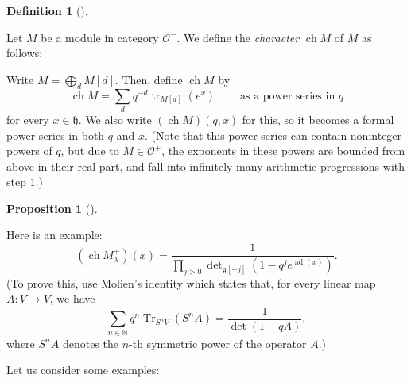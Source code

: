\documentclass
[numbers=enddot,12pt,final,onecolumn,german,notitlepage]{scrartcl}%
\theoremstyle{definition}
\newtheorem{prop}[theo]{Proposition}
\newenvironment{proposition}[1][]
{\begin{prop}[#1]\begin{leftbar}}
{\end{leftbar}\end{prop}}
\newtheorem{defi}[theo]{Definition}
\newenvironment{definition}[1][]
{\begin{defi}[#1]\begin{leftbar}}
{\end{leftbar}\end{defi}}
\begin{document}
\begin{definition}
Let $M$ be a module in category $\mathcal{O}^{+}$. We define the
\textit{character} $\operatorname*{ch}M$ of $M$ as follows:

Write $M=\bigoplus\limits_{d}M\left[  d\right]  $. Then, define
$\operatorname*{ch}M$ by%
\[
\operatorname*{ch}M=\sum\limits_{d}q^{-d}\operatorname*{tr}\nolimits_{M\left[
d\right]  }\left(  e^{x}\right)  \ \ \ \ \ \ \ \ \ \ \text{as a power series
in }q
\]
for every $x\in\mathfrak{h}$. We also write $\left(  \operatorname*{ch}%
M\right)  \left(  q,x\right)  $ for this, so it becomes a formal power series
in both $q$ and $x$. (Note that this power series can contain noninteger
powers of $q$, but due to $M\in\mathcal{O}^{+}$, the exponents in these powers
are bounded from above in their real part, and fall into infinitely many
arithmetic progressions with step $1$.)
\end{definition}

\begin{proposition}
\label{prop.chVerma}Here is an example:%
\[
\left(  \operatorname*{ch}M_{\lambda}^{+}\right)  \left(  x\right)  =\dfrac
{1}{\prod\limits_{j>0}\det\nolimits_{\mathfrak{g}\left[  -j\right]  }\left(
1-q^{j}e^{\operatorname*{ad}\left(  x\right)  }\right)  }.
\]
(To prove this, use Molien's identity which states that, for every linear map
$A:V\rightarrow V$, we have%
\[
\sum\limits_{n\in\mathbb{N}}q^{n}\operatorname*{Tr}\nolimits_{S^{n}V}\left(
S^{n}A\right)  =\dfrac{1}{\det\left(  1-qA\right)  },
\]
where $S^{n}A$ denotes the $n$-th symmetric power of the operator $A$.)
\end{proposition}

Let us consider some examples:
\end{document}
